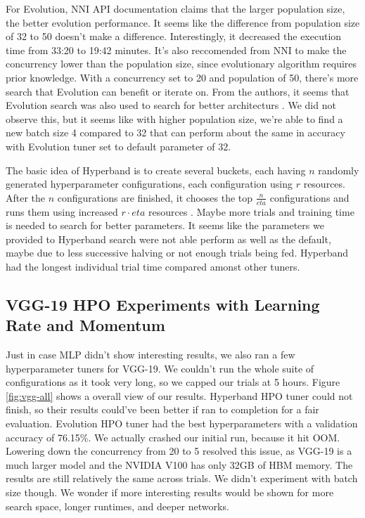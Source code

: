 \documentclass{article}
\begin{document}
For Evolution, NNI API documentation claims that the larger population size, the better evolution performance. It seems like the difference from population size of 32 to 50 doesn't make a difference. Interestingly, it decreased the execution time from 33:20 to 19:42 minutes. 
It's also reccomended from NNI to make the concurrency lower than the population size, since evolutionary algorithm requires prior knowledge. With a concurrency set to 20 and population of 50, there's more search that Evolution can benefit or iterate on. From the authors, it seems that Evolution search was also used to search for better architecturs \cite{evolution}. We did not observe this, but it seems like with higher population size, we're able to find a new batch size 4 compared to 32 that can perform about the same in accuracy with Evolution tuner set to default parameter of 32.

The basic idea of Hyperband is to create several buckets, each having $n$ randomly generated hyperparameter configurations, each configuration using $r$ resources. After the $n$ configurations are finished, it chooses the top $\frac{n}{eta}$ configurations and runs them using increased $r\cdot eta$ resources \cite{hyperband}. Maybe more trials and training time is needed to search for better parameters. It seems like the parameters we provided to Hyperband search were not able perform as well as the default, maybe due to less successive halving or not enough trials being fed. Hyperband had the longest individual trial time compared amonst other tuners.


\subsection{VGG-19 HPO Experiments with Learning Rate and Momentum}
Just in case MLP didn't show interesting results, we also ran a few hyperparameter tuners for VGG-19. We couldn't run the whole suite of configurations as it took very long, so we capped our trials at 5 hours. Figure \ref{fig:vgg-all} shows a overall view of our results. Hyperband HPO tuner could not finish, so their results could've been better if ran to completion for a fair evaluation. Evolution HPO tuner had the best hyperparameters with a validation accuracy of 76.15\%. We actually crashed our initial run, because it hit OOM. Lowering down the concurrency from 20 to 5 resolved this issue, as VGG-19 is a much larger model and the NVIDIA V100 has only 32GB of HBM memory. The results are still relatively the same across trials. We didn't experiment with batch size though. We wonder if more interesting results would be shown for more search space, longer runtimes, and deeper networks.
\end{document}

